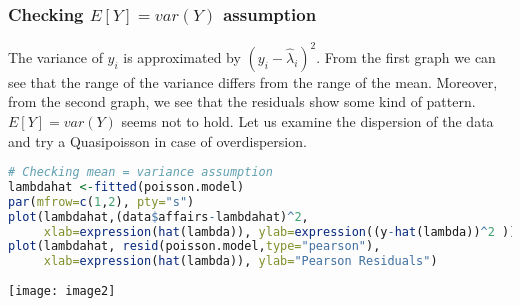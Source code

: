 \documentclass[border=5mm, convert, usenames, dvipsnames,beamer]{standalone}
\begin{document}
\begin{frame}[ fragile]{}
\frametitle{Checking $E[Y] = var(Y)$ assumption}

\footnotesize
\vspace{15mm}
\noindent
The variance of $y_{i}$ is approximated by $(y_{i} - \hat{\lambda}_{i})^{2}$. From the first graph we can see that the range of the variance differs from the range of the mean. Moreover, from the second graph, we see that the residuals show some kind of pattern. {\color{purple}$E[Y] = var(Y)$ seems not to hold.} Let us examine the dispersion of the data and try a Quasipoisson in case of overdispersion.



\tiny
\begin{lstlisting}[language=R]
# Checking mean = variance assumption
lambdahat <-fitted(poisson.model)
par(mfrow=c(1,2), pty="s")
plot(lambdahat,(data$affairs-lambdahat)^2,
     xlab=expression(hat(lambda)), ylab=expression((y-hat(lambda))^2 ))
plot(lambdahat, resid(poisson.model,type="pearson"), 
     xlab=expression(hat(lambda)), ylab="Pearson Residuals") 
\end{lstlisting}
\par

\vspace{-5}
\noindent
 \texttt{[image: image2]}


\end{frame}
\end{document}

